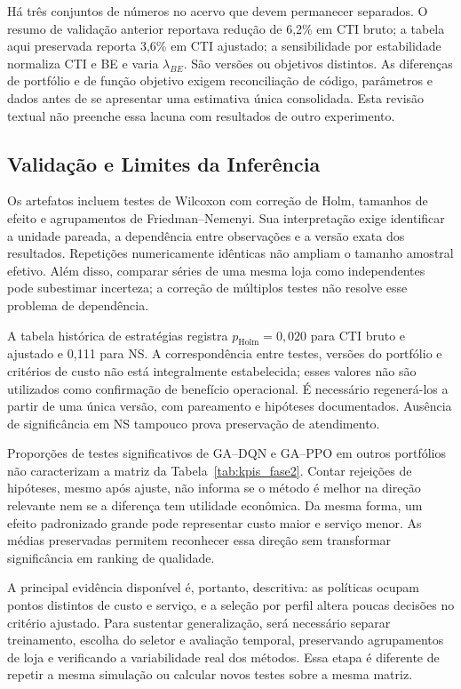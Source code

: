 Há três conjuntos de números no acervo que devem permanecer separados. O resumo de validação anterior reportava redução de 6,2\% em CTI bruto; a tabela aqui preservada reporta 3,6\% em CTI ajustado; a sensibilidade por estabilidade normaliza CTI e BE e varia $\lambda_{BE}$. São versões ou objetivos distintos. As diferenças de portfólio e de função objetivo exigem reconciliação de código, parâmetros e dados antes de se apresentar uma estimativa única consolidada. Esta revisão textual não preenche essa lacuna com resultados de outro experimento.

\subsection{Validação e Limites da Inferência}
\label{sec:stats}

Os artefatos incluem testes de Wilcoxon com correção de Holm, tamanhos de efeito e agrupamentos de Friedman--Nemenyi. Sua interpretação exige identificar a unidade pareada, a dependência entre observações e a versão exata dos resultados. Repetições numericamente idênticas não ampliam o tamanho amostral efetivo. Além disso, comparar séries de uma mesma loja como independentes pode subestimar incerteza; a correção de múltiplos testes não resolve esse problema de dependência.

A tabela histórica de estratégias registra $p_{\mathrm{Holm}}=0{,}020$ para CTI bruto e ajustado e 0,111 para NS. A correspondência entre testes, versões do portfólio e critérios de custo não está integralmente estabelecida; esses valores não são utilizados como confirmação de benefício operacional. É necessário regenerá-los a partir de uma única versão, com pareamento e hipóteses documentados. Ausência de significância em NS tampouco prova preservação de atendimento.

Proporções de testes significativos de GA--DQN e GA--PPO em outros portfólios não caracterizam a matriz da Tabela~\ref{tab:kpis_fase2}. Contar rejeições de hipóteses, mesmo após ajuste, não informa se o método é melhor na direção relevante nem se a diferença tem utilidade econômica. Da mesma forma, um efeito padronizado grande pode representar custo maior e serviço menor. As médias preservadas permitem reconhecer essa direção sem transformar significância em ranking de qualidade.

A principal evidência disponível é, portanto, descritiva: as políticas ocupam pontos distintos de custo e serviço, e a seleção por perfil altera poucas decisões no critério ajustado. Para sustentar generalização, será necessário separar treinamento, escolha do seletor e avaliação temporal, preservando agrupamentos de loja e verificando a variabilidade real dos métodos. Essa etapa é diferente de repetir a mesma simulação ou calcular novos testes sobre a mesma matriz.

